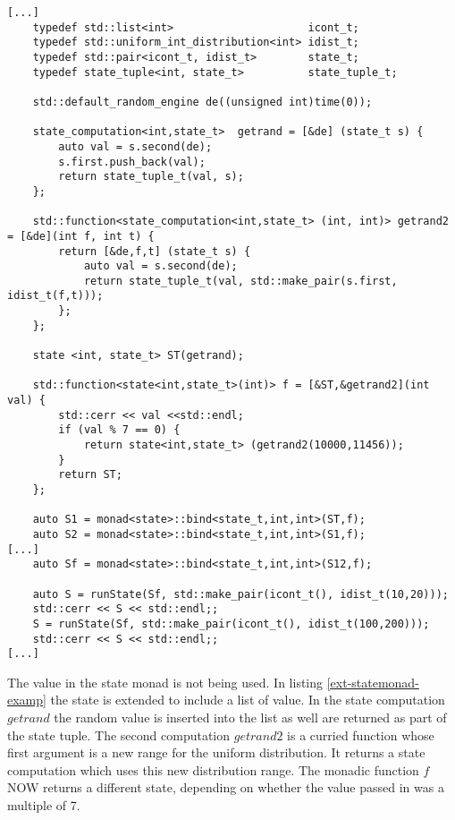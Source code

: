 \documentclass[12pt,fleqn]{article}
\begin{document}
%
%
%
\begin{minipage}{\linewidth}
\begin{lstlisting}[caption=extended state monad example, label=ext-statemonad-examp]
[...]
	typedef std::list<int>                     icont_t;
	typedef std::uniform_int_distribution<int> idist_t;
	typedef std::pair<icont_t, idist_t>        state_t;
	typedef state_tuple<int, state_t>          state_tuple_t;

	std::default_random_engine de((unsigned int)time(0));

	state_computation<int,state_t>  getrand = [&de] (state_t s) {
		auto val = s.second(de);
		s.first.push_back(val);
		return state_tuple_t(val, s);
 	}; 
	
	std::function<state_computation<int,state_t> (int, int)> getrand2 = [&de](int f, int t) {
		return [&de,f,t] (state_t s) {
			auto val = s.second(de);
			return state_tuple_t(val, std::make_pair(s.first, idist_t(f,t)));
		}; 
	};

	state <int, state_t> ST(getrand);

	std::function<state<int,state_t>(int)> f = [&ST,&getrand2](int val) {
		std::cerr << val <<std::endl; 
		if (val % 7 == 0) {
			return state<int,state_t> (getrand2(10000,11456));
		}
		return ST;
	};

	auto S1 = monad<state>::bind<state_t,int,int>(ST,f);
	auto S2 = monad<state>::bind<state_t,int,int>(S1,f);
[...]
	auto Sf = monad<state>::bind<state_t,int,int>(S12,f);

	auto S = runState(Sf, std::make_pair(icont_t(), idist_t(10,20)));
	std::cerr << S << std::endl;;
	S = runState(Sf, std::make_pair(icont_t(), idist_t(100,200)));
	std::cerr << S << std::endl;;
[...]
\end{lstlisting}
\end{minipage}
%
%
%


The value in the state monad is not being used. 
In listing \ref{ext-statemonad-examp} the state is extended to include a list of value.
In the state computation $getrand$ the random value is inserted into the list as well are returned as part of the state tuple.
The second computation $getrand2$ is a curried function whose first argument is a new range for the uniform distribution.
It returns a state computation which uses this new distribution range.
The monadic function $f$ NOW returns a different state, depending on whether the value passed in was a multiple of 7.



%
%
\end{document}
